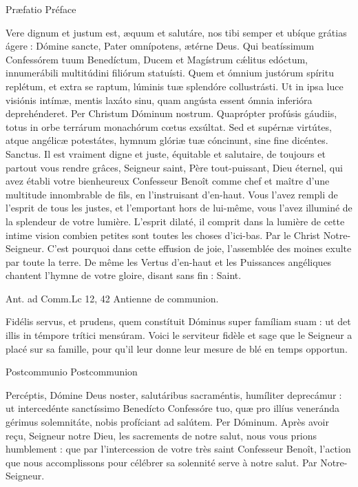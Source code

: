 \begin{paracol}{2}
Præfatio
\switchcolumn
Préface
\switchcolumn*

Vere dignum et justum est, æquum et salutáre, nos tibi semper et ubíque grátias ágere : Dómine sancte, Pater omnípotens, ætérne Deus. Qui beatíssimum Confessórem tuum Benedíctum, Ducem et Magístrum cǽlitus edóctum, innumerábili multitúdini filiórum statuísti. Quem et ómnium justórum spíritu replétum, et extra se raptum, lúminis tuæ splendóre collustrásti. Ut in ipsa luce visiónis intímæ, mentis laxáto sinu, quam angústa essent ómnia inferióra deprehénderet. Per Christum Dóminum nostrum. Quaprópter profúsis gáudiis, totus in orbe terrárum monachórum cœtus exsúltat. Sed et supérnæ virtútes, atque angélicæ potestátes, hymnum glóriæ tuæ cóncinunt, sine fine dicéntes. Sanctus.
\switchcolumn
Il est vraiment digne et juste, équitable et salutaire, de toujours et partout vous rendre grâces, Seigneur saint, Père tout-puissant, Dieu éternel, qui avez établi votre bienheureux Confesseur Benoît comme chef et maître d’une multitude innombrable de fils, en l’instruisant d’en-haut. Vous l’avez rempli de l’esprit de tous les justes, et l’emportant hors de lui-même, vous l’avez illuminé de la splendeur de votre lumière. L’esprit dilaté, il comprit dans la lumière de cette intime vision combien petites sont toutes les choses d’ici-bas. Par le Christ Notre-Seigneur. C’est pourquoi dans cette effusion de joie, l’assemblée des moines exulte par toute la terre. De même les Vertus d’en-haut et les Puissances angéliques chantent l’hymne de votre gloire, disant sans fin : Saint.
\switchcolumn*

Ant. ad Comm.\hfill Lc 12, 42
\switchcolumn
Antienne de communion.
\switchcolumn*

Fidélis servus, et prudens, quem constítuit Dóminus super famíliam suam : ut det illis in témpore trítici mensúram.
\switchcolumn
Voici le serviteur fidèle et sage que le Seigneur a placé sur sa famille, pour qu’il leur donne leur mesure de blé en temps opportun.
\switchcolumn*

Postcommunio
\switchcolumn
Postcommunion
\switchcolumn*

Percéptis, Dómine Deus noster,  salutáribus sacraméntis, humíliter deprecámur : ut intercedénte sanctíssimo Benedícto Confessóre tuo, quæ pro illíus veneránda gérimus solemnitáte, nobis profíciant ad salútem. Per Dóminum.
\switchcolumn
Après avoir reçu, Seigneur notre Dieu,  les sacrements de notre salut, nous vous prions humblement : que par l’intercession de votre très saint Confesseur Benoît, l’action que nous accomplissons pour célébrer sa solennité serve à notre salut. Par Notre-Seigneur.
\switchcolumn*


\end{paracol}
